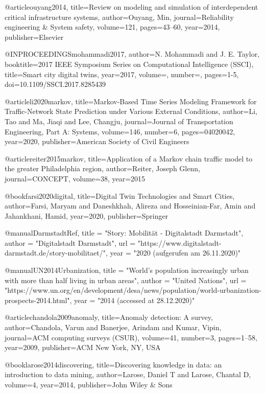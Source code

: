 @article{ouyang2014,
  title={Review on modeling and simulation of interdependent critical infrastructure systems},
  author={Ouyang, Min},
  journal={Reliability engineering \& System safety},
  volume={121},
  pages={43--60},
  year={2014},
  publisher={Elsevier}
}

@INPROCEEDINGS{mohammadi2017,
  author={N. {Mohammadi} and J. E. {Taylor}},
  booktitle={2017 IEEE Symposium Series on Computational Intelligence (SSCI)}, 
  title={Smart city digital twins}, 
  year={2017},
  volume={},
  number={},
  pages={1-5},
  doi={10.1109/SSCI.2017.8285439}}
  
  @article{li2020markov,
  title={Markov-Based Time Series Modeling Framework for Traffic-Network State Prediction under Various External Conditions},
  author={Li, Tao and Ma, Jiaqi and Lee, Changju},
  journal={Journal of Transportation Engineering, Part A: Systems},
  volume={146},
  number={6},
  pages={04020042},
  year={2020},
  publisher={American Society of Civil Engineers}
}

@article{reiter2015markov,
  title={Application of a Markov chain traffic model to the greater Philadelphia region},
  author={Reiter, Joseph Glenn},
  journal={CONCEPT},
  volume={38},
  year={2015}
}

@book{farsi2020digital,
  title={Digital Twin Technologies and Smart Cities},
  author={Farsi, Maryam and Daneshkhah, Alireza and Hosseinian-Far, Amin and Jahankhani, Hamid},
  year={2020},
  publisher={Springer}
}

@manual{DarmstadtRef,
  title  = "Story: Mobilität - Digitalstadt Darmstadt",
  author = "Digitalstadt Darmstadt",
  url    = "https://www.digitalstadt-darmstadt.de/story-mobilitaet/",
  year   = "2020 (aufgerufen am 26.11.2020)"
}

@manual{UN2014Urbanization,
  title  = "World’s population increasingly urban with more than half living in urban areas",
  author = "United Nations",
  url    = "https://www.un.org/en/development/desa/news/population/world-urbanization-prospects-2014.html",
  year   = "2014 (accessed at 28.12.2020)"
}

@article{chandola2009anomaly,
  title={Anomaly detection: A survey},
  author={Chandola, Varun and Banerjee, Arindam and Kumar, Vipin},
  journal={ACM computing surveys (CSUR)},
  volume={41},
  number={3},
  pages={1--58},
  year={2009},
  publisher={ACM New York, NY, USA}
}

@book{larose2014discovering,
  title={Discovering knowledge in data: an introduction to data mining},
  author={Larose, Daniel T and Larose, Chantal D},
  volume={4},
  year={2014},
  publisher={John Wiley \& Sons}
}

